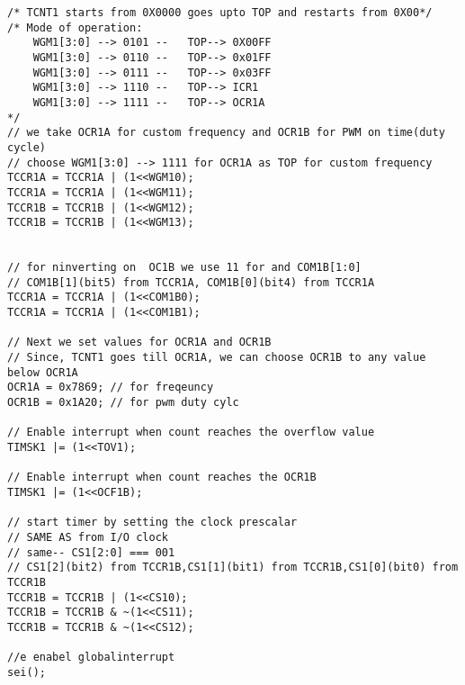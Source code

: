 \documentclass{article}
\begin{document}
\begin{verbatim}
/* TCNT1 starts from 0X0000 goes upto TOP and restarts from 0X00*/
/* Mode of operation:
    WGM1[3:0] --> 0101 --	TOP--> 0X00FF
    WGM1[3:0] --> 0110 --	TOP--> 0x01FF
    WGM1[3:0] --> 0111 --	TOP--> 0x03FF
    WGM1[3:0] --> 1110 --	TOP--> ICR1
    WGM1[3:0] --> 1111 --	TOP--> OCR1A
*/	
// we take OCR1A for custom frequency and OCR1B for PWM on time(duty cycle)	
// choose WGM1[3:0] --> 1111 for OCR1A as TOP for custom frequency
TCCR1A = TCCR1A | (1<<WGM10);
TCCR1A = TCCR1A | (1<<WGM11);
TCCR1B = TCCR1B | (1<<WGM12);
TCCR1B = TCCR1B | (1<<WGM13);


// for ninverting on  OC1B we use 11 for and COM1B[1:0]	
// COM1B[1](bit5) from TCCR1A, COM1B[0](bit4) from TCCR1A
TCCR1A = TCCR1A | (1<<COM1B0);
TCCR1A = TCCR1A | (1<<COM1B1);

// Next we set values for OCR1A and OCR1B
// Since, TCNT1 goes till OCR1A, we can choose OCR1B to any value below OCR1A
OCR1A = 0x7869; // for freqeuncy
OCR1B = 0x1A20; // for pwm duty cylc

// Enable interrupt when count reaches the overflow value
TIMSK1 |= (1<<TOV1);

// Enable interrupt when count reaches the OCR1B
TIMSK1 |= (1<<OCF1B);

// start timer by setting the clock prescalar
// SAME AS from I/O clock
// same-- CS1[2:0] === 001
// CS1[2](bit2) from TCCR1B,CS1[1](bit1) from TCCR1B,CS1[0](bit0) from TCCR1B
TCCR1B = TCCR1B | (1<<CS10);
TCCR1B = TCCR1B & ~(1<<CS11);
TCCR1B = TCCR1B & ~(1<<CS12);

//e enabel globalinterrupt
sei();
\end{verbatim}
\end{document}
